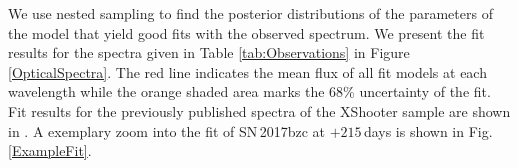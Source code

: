 \documentclass[fleqn,usenatbib]{mnras}
\begin{document}
We use nested sampling to find the posterior distributions of the parameters of the model that yield good fits with the observed spectrum. We present the fit results for the spectra given in Table \ref{tab:Observations} in Figure \ref{OpticalSpectra}. The red line indicates the mean flux of all fit models at each wavelength while the orange shaded area marks the 68\% uncertainty of the fit. Fit results for the previously published spectra of the XShooter sample are shown in \citet{2018A&A...620A.200F}. A exemplary zoom into the fit of SN\,2017bzc at $+215\,$days is shown in Fig. \ref{ExampleFit}.
\end{document}
